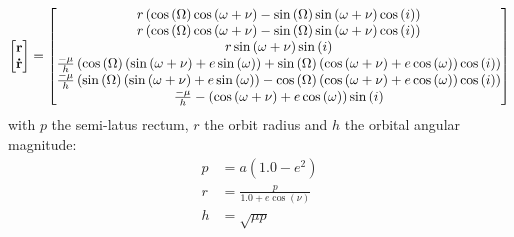 \begin{equation}
	\begin{bmatrix}
		\boldsymbol{\mathbf{r}} \\
		\boldsymbol{\mathbf{\dot{r}}}
	\end{bmatrix} = 
	\begin{bmatrix}
		r \left( \cos{\left({{\Omega}}\right)} \cos{\left({{\omega} + {\nu}}\right)} - \sin{\left({{\Omega}}\right)} \sin{\left({{\omega} + {\nu}}\right)} \cos{\left({i}\right)} \right)\\ 
		r \left( \cos{\left({{\Omega}}\right)} \cos{\left({{\omega} + {\nu}}\right)} - \sin{\left({{\Omega}}\right)} \sin{\left({{\omega} + {\nu}}\right)} \cos{\left({i}\right)} \right)\\
		r \sin{\left({{\omega} + {\nu}}\right)} \sin{\left({i}\right)}\\ 
		\frac{-{\mu}}{h} \left( \cos{\left({{\Omega}}\right)} \left( \sin{\left({{\omega} + {\nu}}\right)} + e \sin{\left({{\omega}}\right)} \right) + \sin{\left({{\Omega}}\right)} \left( \cos{\left({{\omega} + {\nu}}\right)} + e \cos{\left({{\omega}}\right)} \right) \cos{\left({i}\right)} \right)\\ 
		\frac{-{\mu}}{h} \left( \sin{\left({{\Omega}}\right)} \left( \sin{\left({{\omega} + {\nu}}\right)} + e \sin{\left({{\omega}}\right)} \right) - \cos{\left({{\Omega}}\right)} \left( \cos{\left({{\omega} + {\nu}}\right)} + e \cos{\left({{\omega}}\right)} \right) \cos{\left({i}\right)} \right)\\
		\frac{-{\mu}}{h} -\left( \cos{\left({{\omega} + {\nu}}\right)} + e \cos{\left({{\omega}}\right)} \right) \sin{\left({i}\right)}
	\end{bmatrix}
\end{equation}
with $p$ the semi-latus rectum, $r$ the orbit radius and $h$ the orbital angular magnitude:
\begin{align}
	p &= a \left( {1.0} - e^2 \right) \\ 
	r &= \frac{p}{{1.0} + e \cos{\left({{\nu}}\right)}} \\ 
	h &= \sqrt{{\mu} p}
\end{align}

